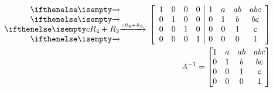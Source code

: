 \documentclass[
  letterpaper,
  DIV=11,
  numbers=noendperiod]{scrartcl}
\begin{document}
\begin{align*}
\rowops{,,cR_4+R_3,}
\left[\begin{array}{cccc|cccc}
1 & 0 & 0 & 0 & 1 & a & ab & abc \\
0 & 1 & 0 & 0 & 0 & 1 & b & bc \\
0 & 0 & 1 & 0 & 0 & 0 & 1 & c \\
0 & 0 & 0 & 1 & 0 & 0 & 0 & 1
\end{array}\right] &\\
A^{-1} = \begin{bmatrix}
1 & a & ab & abc \\
0 & 1 & b & bc \\
0 & 0 & 1 & c \\
0 & 0 & 0 & 1
\end{bmatrix} &\\
\end{align*}
\end{document}
